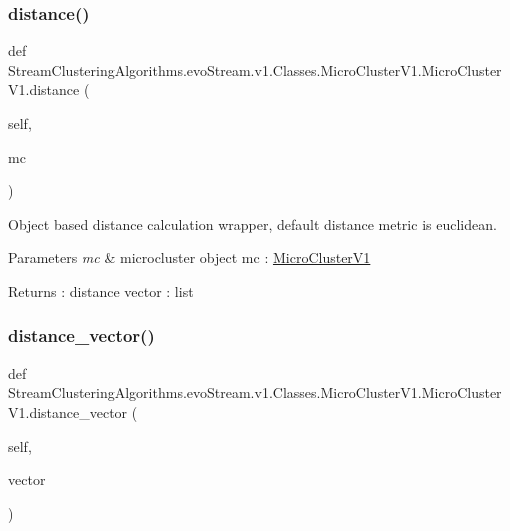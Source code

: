\subsubsection{\texorpdfstring{distance()}{distance()}}
{\footnotesize\ttfamily def Stream\+Clustering\+Algorithms.\+evo\+Stream.\+v1.\+Classes.\+Micro\+Cluster\+V1.\+Micro\+Cluster\+V1.\+distance (\begin{DoxyParamCaption}\item[{}]{self,  }\item[{}]{mc }\end{DoxyParamCaption})}



Object based distance calculation wrapper, default distance metric is euclidean. 


\begin{DoxyParams}{Parameters}
{\em mc} & microcluster object  mc \+: \hyperlink{classStreamClusteringAlgorithms_1_1evoStream_1_1v1_1_1Classes_1_1MicroClusterV1_1_1MicroClusterV1}{Micro\+Cluster\+V1} \\
\hline
\end{DoxyParams}
\begin{DoxyReturn}{Returns}
\+: distance vector  \+: list 
\end{DoxyReturn}
\mbox{\label{classStreamClusteringAlgorithms_1_1evoStream_1_1v1_1_1Classes_1_1MicroClusterV1_1_1MicroClusterV1_aa08f1e1397fba3cf685ab6c57bd618ed}} 
\subsubsection{\texorpdfstring{distance\+\_\+vector()}{distance\_vector()}}
{\footnotesize\ttfamily def Stream\+Clustering\+Algorithms.\+evo\+Stream.\+v1.\+Classes.\+Micro\+Cluster\+V1.\+Micro\+Cluster\+V1.\+distance\+\_\+vector (\begin{DoxyParamCaption}\item[{}]{self,  }\item[{}]{vector }\end{DoxyParamCaption})}



